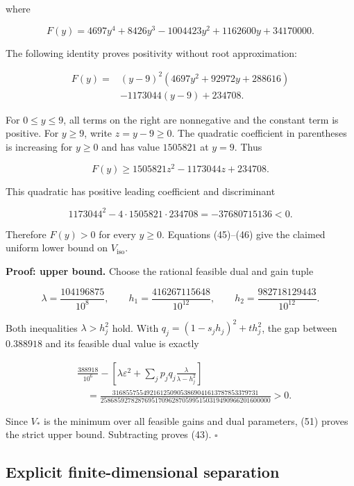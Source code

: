 \documentclass[11pt,a4paper]{article}
\begin{document}
\noindent\begin{minipage}{\linewidth}
where

\[
F(y)=4697y^4+8426y^3-1004423y^2+1162600y+34170000.
\tag{47}
\]
\end{minipage}

The following identity proves positivity without root approximation:

\[
\begin{aligned}
F(y)={}&(y-9)^2(4697y^2+92972y+288616)\\
&-1173044(y-9)+234708.
\end{aligned}
\tag{48}
\]

For \(0\le y\le9\), all terms on the right are nonnegative and the
constant term is positive. For \(y\ge9\), write \(z=y-9\ge0\). The
quadratic coefficient in parentheses is increasing for \(y\ge0\) and has
value \(1505821\) at \(y=9\). Thus

\[
F(y)\ge1505821z^2-1173044z+234708.
\]

This quadratic has positive leading coefficient and discriminant

\[
1173044^2-4\cdot1505821\cdot234708
=-37680715136<0.
\tag{49}
\]

Therefore \(F(y)>0\) for every \(y\ge0\). Equations (45)--(46) give the
claimed uniform lower bound on \(V_{\mathrm{iso}}\).

\textbf{Proof: upper bound.} Choose the rational feasible dual and gain
tuple

\[
\lambda=\frac{104196875}{10^8},\qquad
h_1=\frac{416267115648}{10^{12}},\qquad
h_2=\frac{982718129443}{10^{12}}.
\tag{50}
\]

Both inequalities \(\lambda>h_j^2\) hold. With
\(q_j=(1-s_jh_j)^2+t h_j^2\), the gap between \(0.388918\) and its
feasible dual value is exactly

\[
\begin{aligned}
&\frac{388918}{10^6}
-\left[\lambda\varepsilon^2+
\sum_jp_jq_j\frac{\lambda}{\lambda-h_j^2}\right]\\
&\quad=
\frac{3168557554921612509053869041613787853379731}
{25868592782876951709628705995150319490966201600000}
>0.
\end{aligned}
\tag{51}
\]

Since \(V_*\) is the minimum over all feasible gains and dual
parameters, (51) proves the strict upper bound. Subtracting proves (43).
\(\square\)

\hypertarget{explicit-finite-dimensional-separation}{%
\subsection{Explicit finite-dimensional
separation}\label{explicit-finite-dimensional-separation}}
\end{document}

